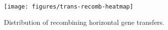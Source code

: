 \documentclass[english]{article}
\begin{document}
\clearpage


\begin{figure}
\begin{center}
\texttt{[image: figures/trans-recomb-heatmap]}
\end{center}
\vspace{-1.2in}
\caption{Distribution of recombining horizontal gene transfers.}
\label{fig:mowgli-recomb-heatmap}
\end{figure}
\clearpage{}
\end{document}
